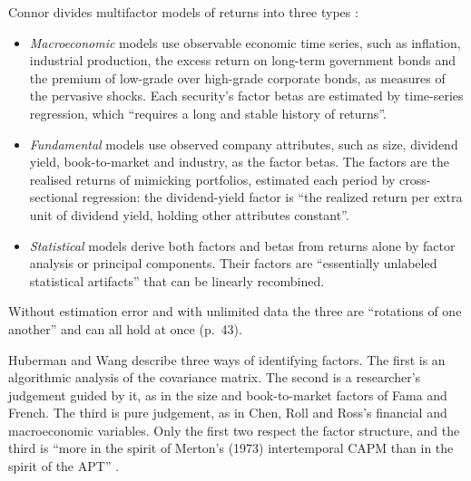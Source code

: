 \begin{qfdefinition}\label{def:factor-model-types}
 Connor divides multifactor models of returns into three types \citep[\emph{Financial Analysts Journal}, May--June 1995, pp.~42--43 and Table~1]{factor-model-types-1995}:
\begin{itemize}
\item \emph{Macroeconomic} models use observable economic time series, such as inflation, industrial production, the excess return on long-term government bonds and the premium of low-grade over high-grade corporate bonds, as measures of the pervasive shocks. Each security's factor betas are estimated by time-series regression, which ``requires a long and stable history of returns''.
\item \emph{Fundamental} models use observed company attributes, such as size, dividend yield, book-to-market and industry, as the factor betas. The factors are the realised returns of mimicking portfolios, estimated each period by cross-sectional regression: the dividend-yield factor is ``the realized return per extra unit of dividend yield, holding other attributes constant''.
\item \emph{Statistical} models derive both factors and betas from returns alone by factor analysis or principal components. Their factors are ``essentially unlabeled statistical artifacts'' that can be linearly recombined.
\end{itemize}
Without estimation error and with unlimited data the three are ``rotations of one another'' and can all hold at once (p.~43).

Huberman and Wang describe three ways of identifying factors. The first is an algorithmic analysis of the covariance matrix. The second is a researcher's judgement guided by it, as in the size and book-to-market factors of Fama and French. The third is pure judgement, as in Chen, Roll and Ross's financial and macroeconomic variables. Only the first two respect the factor structure, and the third is ``more in the spirit of Merton's (1973) intertemporal CAPM than in the spirit of the APT'' \citep[FRBNY Staff Report 216, August 2005, sec.~8]{arbitrage-pricing-review-2005}.


\end{qfdefinition}
